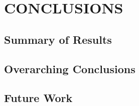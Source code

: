 \chapter{CONCLUSIONS}
\label{chap:conc}

\section{Summary of Results}
\label{sec:summ}


\section{Overarching Conclusions}
\label{sec:conc}


\section{Future Work}
\label{sec:future}
